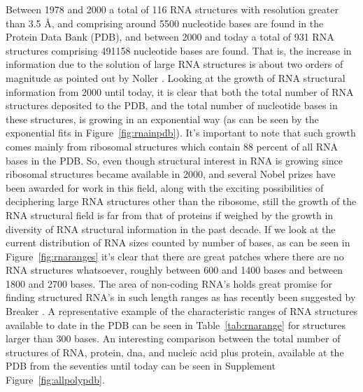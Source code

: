 \noindent Between  1978 and  2000 a total  of 116 RNA  structures with
resolution greater than 3.5 \AA,  and comprising around 5500 nucleotide
bases are found  in the Protein Data Bank (PDB),  and between 2000 and
today  a  total of  931  RNA  structures comprising  491158
nucleotide bases are found.  That  is, the increase in information due
to  the  solution of  large  RNA structures  is  about  two orders  of
magnitude as pointed out  by Noller \cite{noller2005}.  Looking at the
growth  of RNA  structural information  from 2000  until today,  it is
clear that  both the total number  of RNA structures  deposited to the
PDB, and the total number  of nucleotide bases in these structures, is
growing in an exponential way (as  can be seen by the exponential fits
in  Figure~\ref{fig:rnainpdb}).   It's  important  to note  that  such
growth comes mainly from ribosomal structures which contain 88 percent
of all RNA  bases in the PDB.  So, even  though structural interest in
RNA is  growing since ribosomal  structures became available  in 2000,
and several  Nobel prizes  have been awarded  for work in  this field,
along  with  the  exciting  possibilities  of  deciphering  large  RNA
\cite{weinberg2009}  structures  other than  the  ribosome, still  the
growth of  the RNA structural  field is far  from that of  proteins if
weighed by  the growth in  diversity of RNA structural  information in
the past decade. If we look at the current distribution of
RNA  sizes   counted  by   number  of  bases,   as  can  be   seen  in
Figure~\ref{fig:rnaranges}  it's clear  that there  are  great patches
where there are no RNA  structures whatsoever, roughly between 600 and
1400 bases  and between  1800 and 2700  bases. The area  of non-coding
RNA's holds great promise for  finding structured RNA's in such length
ranges    as    has     recently    been    suggested    by    Breaker
\cite{weinberg2009}.  A representative  example of  the characteristic
ranges of RNA  structures available to date in the PDB  can be seen in
Table~\ref{tab:rnarange}  for structures  larger than  300  bases.  An
interesting comparison between the  total number of structures of RNA,
protein, dna, and nucleic acid plus protein, available at the PDB from
the   seventies    until   today    can   be   seen    in   Supplement
Figure~\ref{fig:allpolypdb}.

